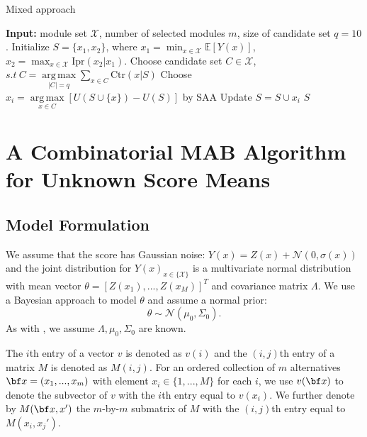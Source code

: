 \documentclass[opre,sglanonrev]{informs4}
\begin{document}
\begin{algorithm}
\caption{Mixed approach} %
\label{alg:mixed} %
\begin{algorithmic}[1] %
\State \textbf{Input:} module set $\mathcal{X}$, number of selected modules $m$, size of candidate set $q=10$.
\State Initialize $S = \{x_1,x_2\}$, where $x_1 = \min_{x\in \mathcal{X}} \mathbb{E}[Y(x)]$, $x_2 = \max_{x\in \mathcal{X}} \text{Ipr}(x_2|x_1)$.
    \State Choose candidate set $C\in \mathcal{X}$, $s.t~C = \mathop{\mathrm{arg\,max}}\limits_{|C|=q} \sum_{x \in C} \text{Ctr}(x|S)$
	\State Choose $x_{i} = \mathop{\mathrm{arg\,max}}\limits_{x\in C} \left[ U(S \cup \{x\}) - U(S) \right]$ by SAA
    \State Update $S = S \cup x_i$
\EndFor
\State \Return $S$
\end{algorithmic}
\end{algorithm}


\section{A Combinatorial MAB Algorithm for Unknown Score Means}
\label{unknown means}
\subsection{Model Formulation}
We assume that the score has Gaussian noise: $Y(x) = Z(x) + \mathcal{N}(0,\sigma(x))$ and the joint distribution for $Y(x)_{x\in\{\mathcal{X}\}}$ is a multivariate normal distribution with mean vector $\theta = [Z(x_1),...,Z(x_M)]^T$ and covariance matrix $\Lambda$. We use a Bayesian approach to model $\theta$ and assume a normal prior:
$$\theta \sim \mathcal{N}(\mu_0, \Sigma_0). $$
As with \cite{xie2016bayesian}, we assume $\Lambda, \mu_0, \Sigma_0$ are known.

The $i$th entry of a vector $v$ is denoted as $v(i)$ and the $(i,j)$th entry of a matrix $M$ is denoted as $M(i,j)$. For an ordered collection of $m$ alternatives ${\bf x}=(x_1,...,x_m)$ with element $x_i \in \{1,...,M\}$ for each $i$, we use $v(\bf x)$ to denote the subvector of $v$ with the $i$th entry equal to $v(x_i)$. We further denote by $M(\bf x, x')$ the $m$-by-$m$ submatrix of $M$ with the $(i,j)$th entry equal to $M(x_i, x_j')$.  
\end{document}
